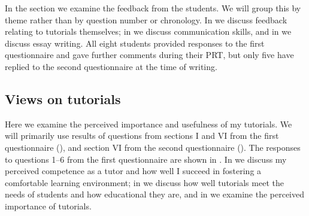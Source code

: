 In the section we examine the feedback from the students. We will group this by theme rather than by question number or chronology. In  we discuss feedback relating to tutorials themselves; in  we discuss communication skills, and in  we discuss essay writing. All eight students provided responses to the first questionnaire and gave further comments during their PRT, but only five have replied to the second questionnaire at the time of writing.

\subsection{Views on tutorials}\label{sec:tutor-results}

Here we examine the perceived importance and usefulness of my tutorials. We will primarily use results of questions from sections I and VI from the first questionnaire (), and section VI from the second questionnaire (). The responses to questions 1--6 from the first questionnaire are shown in . In  we discuss my perceived competence as a tutor and how well I succeed in fostering a comfortable learning environment; in  we discuss how well tutorials meet the needs of students and how educational they are, and in  we examine the perceived importance of tutorials.
